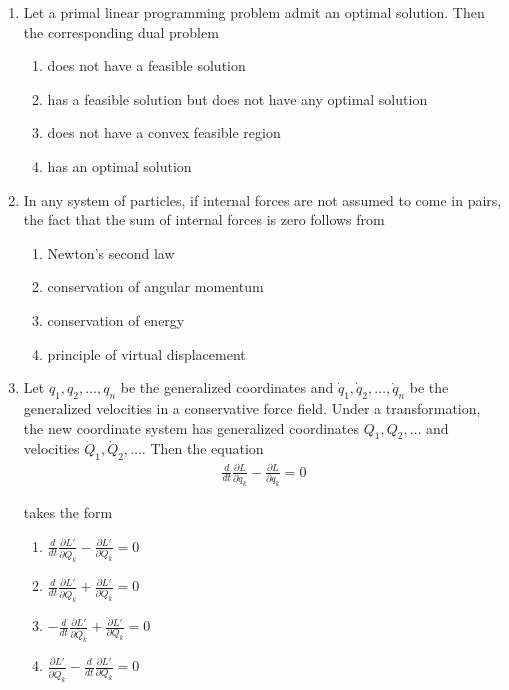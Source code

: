 \documentclass[journal]{IEEEtran}
\numberwithin{equation}{enumi}
\numberwithin{figure}{enumi}
\begin{document}
\begin{enumerate}
\item Let a primal linear programming problem admit an optimal solution. Then the corresponding dual problem
\hfill{}

\begin{enumerate}
\item does not have a feasible solution
\item has a feasible solution but does not have any optimal solution
\item does not have a convex feasible region
\item has an optimal solution
\end{enumerate}


\item In any system of particles, if internal forces are not assumed to come in pairs, the fact that the sum of internal forces is zero follows from
\hfill{}

\begin{enumerate}
\item Newton's second law
\item conservation of angular momentum
\item conservation of energy
\item principle of virtual displacement
\end{enumerate}


\item Let \(q_1, q_2, \ldots, q_n\) be the generalized coordinates and \(\dot{q}_1, \dot{q}_2, \ldots, \dot{q}_n\) be the generalized velocities in a conservative force field. Under a transformation, the new coordinate system has generalized coordinates \(Q_1, Q_2, \ldots\) and velocities \(\dot{Q}_1, \dot{Q}_2, \ldots\). Then the equation
\begin{align}
    \frac{d}{dt}\frac{\partial L}{\partial \dot{q}_k} - \frac{\partial L}{\partial q_k} = 0
\end{align}


takes the form
\hfill{}
\begin{multicols}{4}
\begin{enumerate}
\item \(\frac{d}{dt}\frac{\partial L'}{\partial \dot{Q}_k} - \frac{\partial L'}{\partial Q_k} = 0\)
\item \(\frac{d}{dt}\frac{\partial L'}{\partial \dot{Q}_k} + \frac{\partial L'}{\partial Q_k} = 0\)
\item \(-\frac{d}{dt}\frac{\partial L'}{\partial \dot{Q}_k} + \frac{\partial L'}{\partial Q_k} = 0\)
\item \(\frac{\partial L'}{\partial \dot{Q}_k} - \frac{d}{dt}\frac{\partial L'}{\partial Q_k} = 0\)
\end{enumerate}
\end{multicols}


\end{enumerate}
\end{document}
